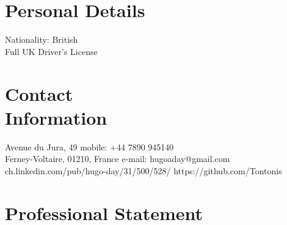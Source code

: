 \documentclass[margin,line]{resume}
\begin{document}
\begin{resume}

    \section{\mysidestyle Personal Details}
    Nationality: British \vspace{0mm}\\\vspace{-4.5mm}%
    Full UK Driver's License  \vspace{0mm}\\\vspace{-4.5mm}%


    \section{\mysidestyle Contact\\Information}
    Avenue du Jura, 49                            \hfill mobile: +44 7890 945140          \vspace{0mm}\\\vspace{0mm}%
    Ferney-Voltaire, 01210, France                          \hfill e-mail: hugoaday@gmail.com  \vspace{0mm}\\\vspace{-4.5mm} %
    ch.linkedin.com/pub/hugo-day/31/500/528/    \hfill https://github.com/Tontonis  \vspace{0mm}\\\vspace{-4.5mm}%

%
   \section{\mysidestyle Professional Statement}


\end{resume}
\end{document}
